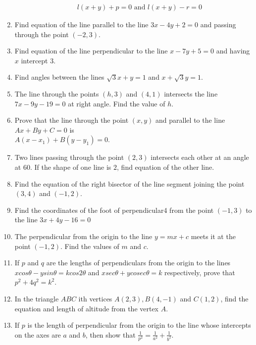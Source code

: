 \documentclass{article}
\theoremstyle{remark}
\begin{document}
\begin{enumerate}
\begin{enumerate}[label=(\roman*)]
\begin{align}
        l(x+y)+p=0 \text{ and } l(x+y)-r=0
              \end{align}
\end{enumerate}
\item Find equation of the line parallel to the line $3x-4y+2=0$ and passing through the point $(-2,3)$.
\item Find equation of the line perpendicular to the line $x-7y+5=0$ and having $x$ intercept $3$.
\item Find angles between the lines $\sqrt3x+y=1$ and $x+\sqrt3y=1$.
\item The line through the points $(h,3)$ and $(4,1)$ intersects the line $7x-9y-19=0$ at right angle. Find the value of $h$.
\item Prove that the line through the point $(x,y)$ and parallel to the line $Ax+By+C=0$ is
\\ $A(x-x_1)+B(y-y_1)=0$.
\item Two lines passing through the point $(2,3)$ intersects each other at an angle at 60\degree. If the shape of one line is $2$, find equation of the other line.
\item Find the equation of the right bisector of the line segment joining the point $(3,4)$ and $(-1,2)$.
\item Find the coordinates of the foot of perpendicular4 from the point $(-1,3)$ to the line $3x+4y-16=0$
\item The perpendicular from the origin to the line $y=mx+c$ meets it at the point $(-1,2)$. Find the values of $m$ and $c$.
\item If $p$ and $q$ are the lengths of perpendiculars from the origin to the lines $x cos\theta-y sin\theta=k cos 2\theta$ and $x sec\theta+y cosec\theta=k$ respectively, prove that $p^2+4q^2=k^2$.
\item In the triangle $ABC$ ith vertices $A(2,3), B(4,-1)$ and $C(1,2)$, find the equation and length of altitude from the vertex $A$.
\item If $p$ is the length of perpendicular from the origin to the line whose intercepts on the axes are $a$  and $b$, then show that $\frac{1}{p^2}=\frac{1}{a^2}+\frac{1}{b^2}$.
\end{enumerate}
\end{document}
